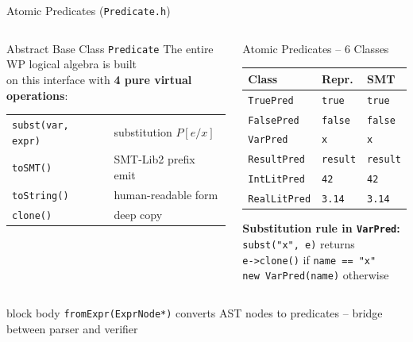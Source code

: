 \documentclass[aspectratio=169,11pt]{beamer}
\begin{document}
\begin{frame}{Atomic Predicates (\texttt{Predicate.h})}
\begin{columns}[c]
  \begin{block}{Abstract Base Class \texttt{Predicate}}
    \medskip
    \normalsize The entire WP logical algebra is built\\
    on this interface with \textbf{4 pure virtual operations}:
    \bigskip

    \begin{tabular}{ll}
      \texttt{subst(var, expr)} & substitution $P[e/x]$\\[4pt]
      \texttt{toSMT()}          & SMT-Lib2 prefix emit\\[4pt]
      \texttt{toString()}       & human-readable form\\[4pt]
      \texttt{clone()}          & deep copy\\
    \end{tabular}
    \bigskip
  \end{block}

  \begin{exampleblock}{Atomic Predicates -- 6 Classes}
    \medskip
    \begin{tabular}{lll}
      \textbf{Class} & \textbf{Repr.} & \textbf{SMT} \\
      \hline
      \texttt{TruePred}    & \texttt{true}   & \texttt{true} \\
      \texttt{FalsePred}   & \texttt{false}  & \texttt{false} \\
      \texttt{VarPred}     & \texttt{x}      & \texttt{x} \\
      \texttt{ResultPred}  & \texttt{result} & \texttt{result} \\
      \texttt{IntLitPred}  & \texttt{42}     & \texttt{42} \\
      \texttt{RealLitPred} & \texttt{3.14}   & \texttt{3.14} \\
    \end{tabular}
    \medskip

    \textbf{Substitution rule in \texttt{VarPred}:}\\[4pt]
    \small \texttt{subst("x", e)} returns\\
    \quad\texttt{e->clone()} \quad if \texttt{name == "x"}\\
    \quad\texttt{new VarPred(name)} \quad otherwise
    \medskip
  \end{exampleblock}
\end{columns}

\vspace{0.2cm}
\begin{beamercolorbox}[rounded=true,center,wd=0.88\textwidth]{block body}
  \centering\small
  \texttt{fromExpr(ExprNode*)} converts AST nodes to predicates -- bridge between parser and verifier
\end{beamercolorbox}
\end{frame}
\end{document}
